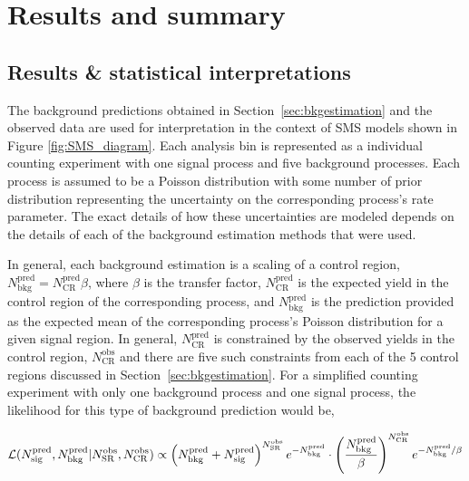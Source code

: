 \chapter{Results and summary}
\label{Chap4}
\section{Results \& statistical interpretations}
\label{sec:results}

The background predictions obtained in Section~\ref{sec:bkgestimation}
and the observed data are used for interpretation in the context of SMS models shown in Figure \ref{fig:SMS_diagram}. 
Each analysis bin is represented as a individual counting experiment with one 
signal process and five background processes.  Each process is assumed 
to be a Poisson distribution with some number of prior distribution representing
the uncertainty on the corresponding process's rate parameter. The exact
details of how these uncertainties are modeled depends on the 
details of each of the background estimation methods that were used. 

In general, each background estimation is a scaling of a control region,
$N^{\mathrm{pred}}_{\mathrm{bkg}}=N^{\mathrm{pred}}_{\mathrm{CR}}\beta$, where $\beta$ 
is the transfer factor, $N^{\mathrm{pred}}_{\mathrm{CR}}$ is the expected yield in the 
control region of the corresponding process, and $N^{\mathrm{pred}}_{\mathrm{bkg}}$ is the 
prediction provided as the expected mean of the corresponding process's
Poisson distribution for a given signal region.  In general,  $N^{\mathrm{pred}}_{\mathrm{CR}}$
is constrained by the observed yields in the control region, 
$N^{\mathrm{obs}}_{\mathrm{CR}}$ and there are five such constraints from each 
of the 5 control regions discussed in Section~\ref{sec:bkgestimation}.  For a 
simplified counting experiment with only one background process and one signal
process, the likelihood for this type of background prediction would be, 

\begin{equation}
\centering
\mathcal{L}(N^{\mathrm{pred}}_{\mathrm{sig}},N^{\mathrm{pred}}_{\mathrm{bkg}}|N^{\mathrm{obs}}_{\mathrm{SR}},N^{\mathrm{obs}}_{\mathrm{CR}}) \propto \left(N^{\mathrm{pred}}_{\mathrm{bkg}}+N^{\mathrm{pred}}_{\mathrm{sig}}\right)^{N^{\mathrm{obs}}_{\mathrm{SR}}}e^{-N^{\mathrm{pred}}_{\mathrm{bkg}}}\cdot\left(\frac{N^{\mathrm{pred}}_{\mathrm{bkg}}}{\beta}\right)^{N^{\mathrm{obs}}_{\mathrm{CR}}} e^{-N^{\mathrm{pred}}_{\mathrm{bkg}}/\beta}
\end{equation}

